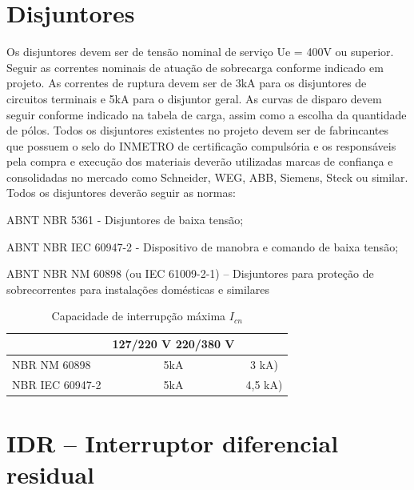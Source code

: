 \section{Disjuntores}
Os disjuntores devem ser de tensão nominal de serviço Ue = 400V ou superior. Seguir as correntes nominais de atuação de sobrecarga conforme indicado em projeto. As correntes de ruptura devem ser de 3kA para os disjuntores de circuitos terminais e 5kA para o disjuntor geral. As curvas de disparo devem seguir conforme indicado na tabela de carga, assim como a escolha da quantidade de pólos.
Todos os disjuntores existentes no projeto devem ser de fabrincantes que possuem o selo do INMETRO de certificação compulsória e os responsáveis pela compra e execução dos materiais deverão utilizadas marcas de confiança e consolidadas no mercado como Schneider, WEG, ABB, Siemens, Steck ou similar. 
Todos os disjuntores deverão seguir as normas:\begin{list}{•}{•}
\item ABNT NBR 5361 - Disjuntores de baixa tensão;
\item ABNT NBR IEC 60947-2 -  Dispositivo de manobra e comando de baixa tensão;
\item ABNT NBR NM 60898 (ou IEC 61009-2-1) – Disjuntores para proteção de sobrecorrentes para instalações domésticas e similares
\end{list}



\begin{table}[htbp]
\centering
\caption{Capacidade de interrupção máxima $I_{cn}$ }

\begin{tabular}{|l|c|c}

& 127/220 V 220/380 V  \\\hline
NBR NM 60898 & 5kA & 3 kA)\\ \hline
NBR IEC 60947-2 & 5kA & 4,5 kA)\\ \hline
\end{tabular}
\label{tab:disjIcn}
\end{table}



\section{IDR – Interruptor diferencial residual}

